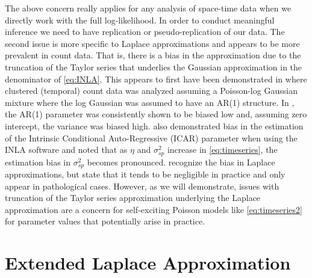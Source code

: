 \documentclass[11pt]{isuthesis}
\begin{document}
	The above concern really applies for any analysis of space-time data when we directly work with the full log-likelihood.  In order to conduct meaningful inference we need to have replication or pseudo-replication of our data.  The second issue is more specific to Laplace approximations and appears to be more prevalent in count data.  That is, there is a bias in the approximation due to the truncation of the Taylor series that underlies the Gaussian approximation in the denominator of \eqref{eq:INLA}.   This appears to first have been demonstrated in \cite{joe2008accuracy} where clustered (temporal) count data was analyzed assuming a Poisson-log Gaussian mixture where the log Gaussian was assumed to have an AR(1) structure.  In \cite{joe2008accuracy}, the AR(1) parameter was consistently shown to be biased low and, assuming zero intercept, the variance was biased high.  \cite{carroll2015comparing} also demonstrated bias in the estimation of the Intrinsic Conditional Auto-Regressive (ICAR) parameter when using the INLA software and \cite{2017arXiv170308429C} noted that as $\eta$ and $\sigma^2_{sp}$ increase in \eqref{eq:timeseries}, the estimation bias in $\sigma^2_{sp}$ becomes pronounced.  \cite{rue2009approximate} recognize the bias in Laplace approximations, but state that it tends to be negligible in practice and only appear in pathological cases.  However, as we will demonstrate, issues with truncation of the Taylor series approximation underlying the Laplace approximation are a concern for self-exciting Poisson models like \eqref{eq:timeseries2} for parameter values that potentially arise in practice.
	
	\section{Extended Laplace Approximation}
	
\end{document}
